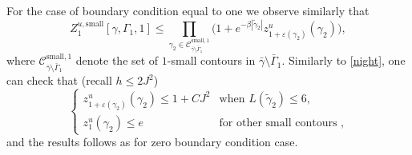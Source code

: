 \documentclass[JEP,XML,SOM,Unicode, NoFloatCountersInSection]{cedram}
\let\mathcal\mathscr
\numberwithin{equation}{section}
\theoremstyle{plain}
\theoremstyle{definition}
\newcommand{\sm}{\mathrm{small}}
\newcommand{\cC}{{\ensuremath{\mathcal C}} }
\newcommand{\gb}{\beta}
\newcommand{\gep}{\varepsilon}
\newcommand{\gG}{\Gamma}
\begin{document}
For the case of boundary condition equal to one we observe similarly that
\begin{equation*}
Z^{u,\sm}_{1}[\gamma,\gG_1,1]\le
\prod_{\gamma_2 \in \cC^{\sm,1}_{\bar \gamma\setminus \bar \gG_1}}
\bigl(1+ e^{-\gb |\tilde\gamma_2|}
z^u_{1+\gep(\gamma_2)}(\gamma_2) \bigr),
\end{equation*}
where $\cC^{\sm,1}_{\bar \gamma\setminus \bar \gG_1}$ denote the set of $1$-small contours in $\bar \gamma\setminus \bar \gG_1$.
Similarly to \eqref{night}, one can check that (recall $h\le 2J^2$)
\begin{equation*}%
\begin{cases}
z^u_{1+\gep(\gamma_2)}(\gamma_2)\le 1+CJ^2 &\text{when } L(\tilde\gamma_2)\le 6,\\
z^u_{1}(\gamma_2)\le e &\text{for other small contours },
\end{cases}
\end{equation*}
and the results follows as for zero boundary condition case.
\end{document}
